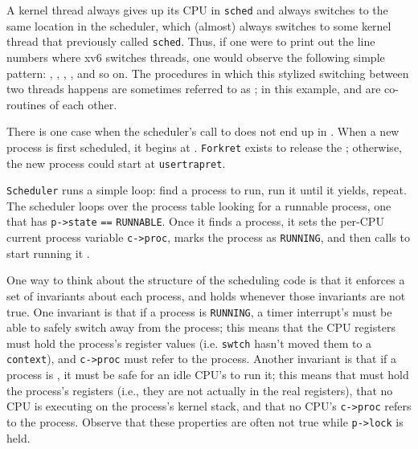 A kernel thread always gives up its
CPU in
\lstinline{sched} 
and always switches to the same location in the scheduler, which
(almost) always switches to some kernel thread that previously called
\lstinline{sched}. 
Thus, if one were to print out the line numbers where xv6 switches
threads, one would observe the following simple pattern:
,
,
,
,
and so on.  The procedures in which this stylized switching between
two threads happens are sometimes referred to as 
; 
in this example,
and
are co-routines of each other.

There is one case when the scheduler's call to
does not end up in
.
When a new process is first scheduled, it begins at
.
\lstinline{Forkret}
exists to release the 
;
otherwise, the new process could start at
\lstinline{usertrapret}.

\lstinline{Scheduler}
runs a simple loop:
find a process to run, run it until it yields, repeat.
The scheduler
loops over the process table
looking for a runnable process, one that has
\lstinline{p->state} 
\lstinline{==}
\lstinline{RUNNABLE}.
Once it finds a process, it sets the per-CPU current process
variable
\lstinline{c->proc},
marks the process as
\lstinline{RUNNING},
and then calls
to start running it
.

One way to think about the structure of the scheduling code is
that it enforces a set of invariants about each process,
and holds
whenever those invariants are not true.
One invariant is that if a process is
\lstinline{RUNNING},
a timer interrupt's
must be able to safely switch away from the process;
this means that the CPU registers must hold the process's register values
(i.e. 
\lstinline{swtch}
hasn't moved them to a
\lstinline{context}),
and
\lstinline{c->proc}
must refer to the process.
Another invariant is that if a process is
,
it must be safe for
an idle CPU's
to run it;
this means that 
must hold the process's registers (i.e., they are
not actually in the real registers),
that no CPU is executing on the process's kernel stack,
and that no CPU's
\lstinline{c->proc}
refers to the process.
Observe that these properties are often not true while
\lstinline{p->lock} is held.

